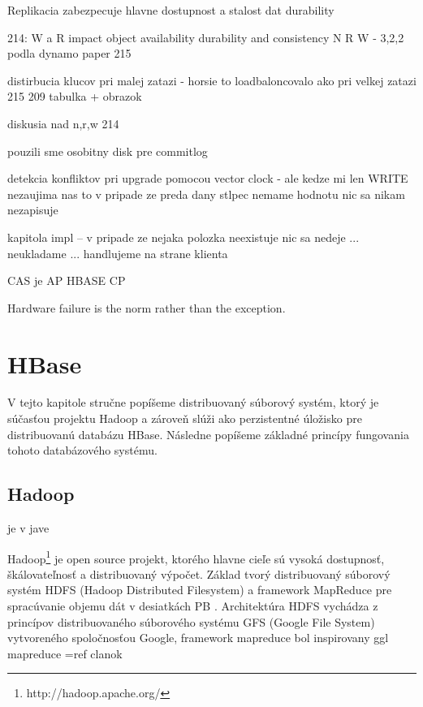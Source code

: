\documentclass[11pt,twoside,a4paper]{book}
\begin{document}
Replikacia zabezpecuje hlavne dostupnost a stalost dat {durability}

214: W a R impact object availability durability and consistency 
N R W - 3,2,2 podla dynamo paper {215}

distirbucia klucov pri malej zatazi - horsie to loadbaloncovalo ako pri velkej zatazi  215
209 tabulka + obrazok

diskusia nad n,r,w 214

pouzili sme osobitny disk pre commitlog


detekcia konfliktov pri upgrade pomocou vector clock - ale kedze mi len WRITE nezaujima nas to
v pripade ze preda dany stlpec nemame hodnotu nic sa nikam nezapisuje


kapitola impl -- v pripade ze nejaka polozka neexistuje nic sa nedeje ... neukladame ... handlujeme na strane klienta


CAS je AP
HBASE CP


Hardware failure is the norm rather than the exception.

\chapter{HBase}
V tejto kapitole stručne popíšeme distribuovaný súborový systém, ktorý je súčasťou projektu Hadoop a zároveň slúži ako perzistentné úložisko pre distribuovanú databázu HBase. Následne popíšeme základné princípy fungovania tohoto databázového systému.

\section*{Hadoop}

je v jave

Hadoop\footnote{http://hadoop.apache.org/} je open source projekt, ktorého hlavne cieľe sú vysoká dostupnosť, škálovateľnosť a distribuovaný výpočet. Základ tvorý distribuovaný súborový systém HDFS (Hadoop Distributed Filesystem) a framework MapReduce pre spracúvanie objemu dát v desiatkách PB \cite{Thusoo:2010:DWA:1807167.1807278}. Architektúra HDFS vychádza z princípov distribuovaného súborového systému GFS (Google File System) vytvoreného spoločnosťou Google\cite{Ghemawat:2003:GFS:945445.945450}, framework mapreduce bol inspirovany ggl mapreduce =ref clanok
\end{document}
